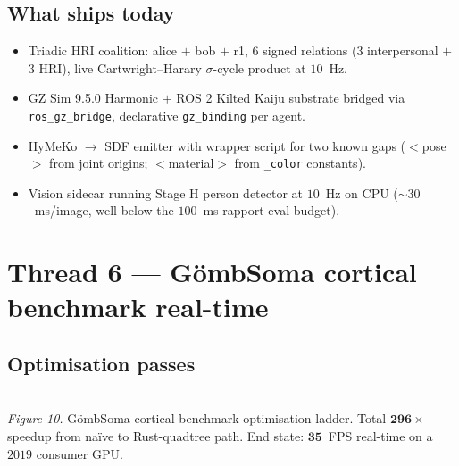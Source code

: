\documentclass[11pt,a4paper]{article}
\newcommand{\code}[1]{\texttt{\small #1}}
\begin{document}
\subsection{What ships today}

\begin{itemize}
  \item Triadic HRI coalition: alice $+$ bob $+$ r1, 6 signed relations
        (3 interpersonal $+$ 3 HRI), live Cartwright--Harary $\sigma$-cycle
        product at $10$~Hz.
  \item GZ Sim 9.5.0 Harmonic $+$ ROS 2 Kilted Kaiju substrate bridged
        via \code{ros\_gz\_bridge}, declarative \code{gz\_binding} per
        agent.
  \item HyMeKo $\to$ SDF emitter with wrapper script for two known gaps
        ($<$pose$>$ from joint origins; $<$material$>$ from \code{*\_color}
        constants).
  \item Vision sidecar running Stage H person detector at $10$~Hz on CPU
        (${\sim}30$~ms/image, well below the $100$~ms rapport-eval budget).
\end{itemize}

\section{Thread 6 --- GömbSoma cortical benchmark real-time}

\subsection{Optimisation passes}

\begin{center}
\\
\small\textit{Figure 10.} GömbSoma cortical-benchmark optimisation ladder. Total $\mathbf{296\times}$
speedup from naïve to Rust-quadtree path. End state: $\mathbf{35}$~FPS real-time on a $2019$ consumer GPU.
\end{center}
\end{document}
